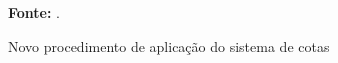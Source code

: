 \begin{figure}[ht!]
\centering

\caption{\textmd{Novo procedimento de aplicação do sistema de cotas}}
\label{fig:mec}

\par\medskip\textbf{Fonte:} . \par\medskip

\end{figure}

